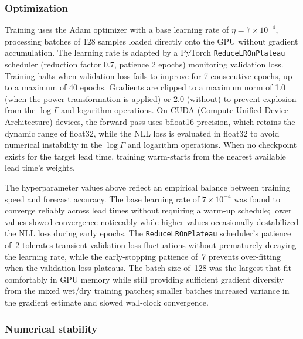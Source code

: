 \documentclass[11pt]{article}
\begin{document}
\subsubsection{Optimization}
\label{sec:optimization}

Training uses the Adam optimizer \citep{kingma2015} with a base learning
rate of $\eta = 7 \times 10^{-4}$, processing batches of 128 samples
loaded directly onto the GPU without gradient accumulation.  The learning
rate is adapted by a PyTorch \texttt{ReduceLROnPlateau} scheduler
(reduction factor 0.7, patience 2 epochs) monitoring validation loss.  Training
halts when validation loss fails to improve for 7 consecutive epochs, up
to a maximum of 40 epochs.  Gradients are clipped to a maximum norm of
1.0 (when the power transformation is applied) or 2.0 (without) to
prevent explosion from the $\log\Gamma$ and logarithm operations.  On
CUDA (Compute Unified Device Architecture) devices, the forward pass uses
bfloat16 precision, which retains the dynamic range of float32, while the
NLL loss is evaluated in float32 to avoid numerical instability in the
$\log\Gamma$ and logarithm operations.
When no checkpoint exists for the target lead time, training warm-starts
from the nearest available lead time's weights.

The hyperparameter values above reflect an empirical balance
between training speed and forecast accuracy.  The base learning
rate of $7\times10^{-4}$ was found to converge reliably across lead
times without requiring a warm-up schedule; lower values slowed
convergence noticeably while higher values occasionally destabilized
the NLL loss during early epochs.  The \texttt{ReduceLROnPlateau}
scheduler's patience of~2 tolerates transient validation-loss
fluctuations without prematurely decaying the learning rate, while
the early-stopping patience of~7 prevents over-fitting when the
validation loss plateaus.  The batch size of~128 was the largest
that fit comfortably in GPU memory while still providing sufficient
gradient diversity from the mixed wet/dry training patches; smaller
batches increased variance in the gradient estimate and slowed
wall-clock convergence.

\subsubsection{Numerical stability}
\label{sec:stability}
\end{document}
